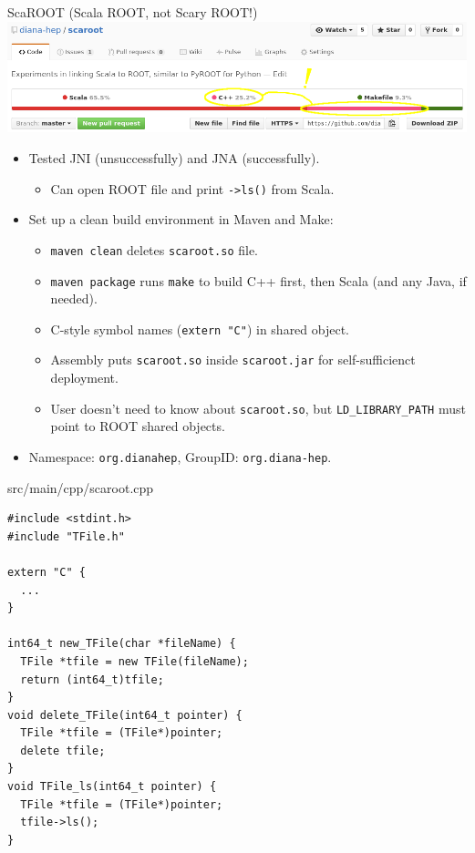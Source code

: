 \documentclass{beamer}
\begin{document}
\begin{frame}{ScaROOT {\small (Scala ROOT, not Scary ROOT!)}}
\includegraphics[width=\linewidth]{scaroot_languages.png}

\vspace{0.2 cm}
\begin{itemize}
\item Tested JNI (unsuccessfully) and JNA (successfully).
\begin{itemize}
\item Can open ROOT file and print {\tt ->ls()} from Scala.
\end{itemize}
\item Set up a clean build environment in Maven and Make:
\begin{itemize}
\item {\tt maven clean} deletes {\tt scaroot.so} file.
\item {\tt maven package} runs {\tt make} to build C++ first, then Scala (and any Java, if needed).
\item C-style symbol names ({\tt extern "C"}) in shared object.
\item Assembly puts {\tt scaroot.so} inside {\tt scaroot.jar} for self-sufficienct deployment.
\item User doesn't need to know about {\tt scaroot.so}, but {\tt LD\_LIBRARY\_PATH} must point to ROOT shared objects.
\end{itemize}
\item Namespace: {\tt org.dianahep}, GroupID: {\tt org.diana-hep}.
\end{itemize}
\end{frame}

\begin{frame}[fragile]{src/main/cpp/scaroot.cpp}
\small
\begin{verbatim}
#include <stdint.h>
#include "TFile.h"

extern "C" {
  ...
}

int64_t new_TFile(char *fileName) {
  TFile *tfile = new TFile(fileName);
  return (int64_t)tfile;
}
void delete_TFile(int64_t pointer) {
  TFile *tfile = (TFile*)pointer;
  delete tfile;
}
void TFile_ls(int64_t pointer) {
  TFile *tfile = (TFile*)pointer;
  tfile->ls();
}
\end{verbatim}
\end{frame}
\end{document}
